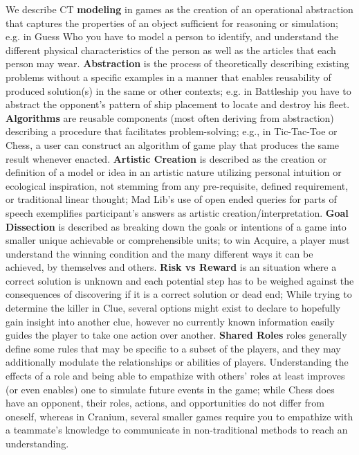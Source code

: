 \documentclass{acm_proc_article-sp}
\begin{document}
We describe CT \textbf{modeling} in games as the creation of an operational abstraction that captures the properties of an object sufficient for reasoning or simulation; e.g. in Guess Who you have to model a person to identify, and understand the different physical characteristics of the person as well as the articles that each person may wear.
\textbf{Abstraction} is the process of theoretically describing existing problems without a specific examples in a manner that enables reusability of produced solution(s) in the same or other contexts; e.g. in Battleship you have to abstract the opponent's pattern of ship placement to locate and destroy his fleet.
\textbf{Algorithms} are reusable components (most often deriving from abstraction) describing a procedure that facilitates problem-solving; e.g., in Tic-Tac-Toe or Chess, a user can construct an algorithm of game play that produces the same result whenever enacted.
\textbf{Artistic Creation} is described as the creation or definition of a model or idea in an artistic nature utilizing personal intuition or ecological inspiration, not stemming from any pre-requisite, defined requirement, or traditional linear thought; Mad Lib's use of open ended queries for parts of speech exemplifies participant's answers as artistic creation/interpretation.
\textbf{Goal Dissection} is described as breaking down the goals or intentions of a game into smaller unique achievable or comprehensible units; to win Acquire, a player must understand the winning condition and the many different ways it can be achieved, by themselves and others.
\textbf{Risk vs Reward} is an situation where a correct solution is unknown and each potential step has to be weighed against the consequences of discovering if it is a correct solution or dead end; While trying to determine the killer in Clue, several options might exist to declare to hopefully gain insight into another clue, however no currently known information easily guides the player to take one action over another.
\textbf{Shared Roles} roles generally define some rules that may be specific to a subset of the players, and they may additionally modulate the relationships or abilities of players.
Understanding the effects of a role and being able to empathize with others' roles at least improves (or even enables) one to simulate future events in the game; while Chess does have an opponent, their roles, actions, and opportunities do not differ from oneself, whereas in Cranium, several smaller games require you to empathize with a teammate's knowledge to communicate in non-traditional methods to reach an understanding.
\end{document}
